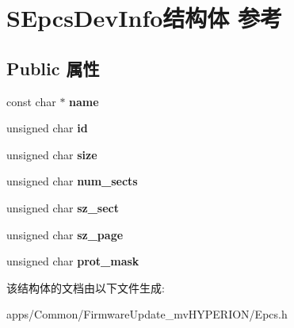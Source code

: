 \hypertarget{struct_s_epcs_dev_info}{\section{S\+Epcs\+Dev\+Info结构体 参考}
\label{struct_s_epcs_dev_info}
}
\subsection*{Public 属性}
\begin{DoxyCompactItemize}
\item 
\hypertarget{struct_s_epcs_dev_info_a09f0b77d4841cd23e9248b8df6df526a}{const char $\ast$ {\bfseries name}}\label{struct_s_epcs_dev_info_a09f0b77d4841cd23e9248b8df6df526a}

\item 
\hypertarget{struct_s_epcs_dev_info_aa8fef495e428945e49d0b2971ad5e329}{unsigned char {\bfseries id}}\label{struct_s_epcs_dev_info_aa8fef495e428945e49d0b2971ad5e329}

\item 
\hypertarget{struct_s_epcs_dev_info_ae19e4ead7d0fd2b856ff2dac675851e3}{unsigned char {\bfseries size}}\label{struct_s_epcs_dev_info_ae19e4ead7d0fd2b856ff2dac675851e3}

\item 
\hypertarget{struct_s_epcs_dev_info_a29ff03b47d508537e3a40035b03221d7}{unsigned char {\bfseries num\+\_\+sects}}\label{struct_s_epcs_dev_info_a29ff03b47d508537e3a40035b03221d7}

\item 
\hypertarget{struct_s_epcs_dev_info_abd5e65082b1175f773197620ddd3ae52}{unsigned char {\bfseries sz\+\_\+sect}}\label{struct_s_epcs_dev_info_abd5e65082b1175f773197620ddd3ae52}

\item 
\hypertarget{struct_s_epcs_dev_info_aba879751143dabbae6a220d1078236e1}{unsigned char {\bfseries sz\+\_\+page}}\label{struct_s_epcs_dev_info_aba879751143dabbae6a220d1078236e1}

\item 
\hypertarget{struct_s_epcs_dev_info_ad7e9ffa1e12d3916371d41cb03891b4c}{unsigned char {\bfseries prot\+\_\+mask}}\label{struct_s_epcs_dev_info_ad7e9ffa1e12d3916371d41cb03891b4c}

\end{DoxyCompactItemize}


该结构体的文档由以下文件生成\+:\begin{DoxyCompactItemize}
\item 
apps/\+Common/\+Firmware\+Update\+\_\+mv\+H\+Y\+P\+E\+R\+I\+O\+N/Epcs.\+h\end{DoxyCompactItemize}
